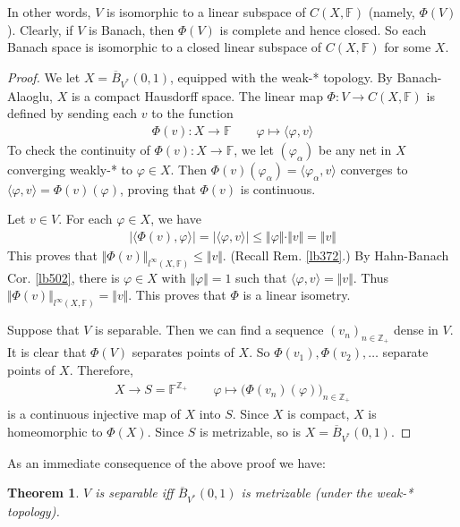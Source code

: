 \documentclass[12pt,b5paper,notitlepage]{article}
\theoremstyle{definition}
\theoremstyle{plain}
\newtheorem{thm}[df]{Theorem}
\newcommand{\ovl}{\overline}
\newcommand{\bk}[1]{\langle {#1}\rangle}
\newcommand{\Zbb}{\mathbb Z}
\newcommand{\Fbb}{\mathbb F}
\numberwithin{equation}{section}
\begin{document}
In other words, $V$ is isomorphic to a linear subspace of $C(X,\Fbb)$ (namely, $\Phi(V)$). Clearly, if $V$ is Banach, then $\Phi(V)$ is complete and hence closed. So each Banach space is isomorphic to a closed linear subspace of $C(X,\Fbb)$ for some $X$.

\begin{proof}
We let $X=\ovl B_{V^*}(0,1)$, equipped with the weak-* topology. By Banach-Alaoglu, $X$ is a compact Hausdorff space. The linear map $\Phi:V\rightarrow C(X,\Fbb)$ is defined by sending each $v$ to the function
\begin{align*}
\Phi(v):X\rightarrow \Fbb\qquad\varphi\mapsto \bk{\varphi,v}
\end{align*}
To check the continuity of $\Phi(v):X\rightarrow\Fbb$, we let $(\varphi_\alpha)$ be any net in $X$ converging weakly-* to $\varphi\in X$. Then $\Phi(v)(\varphi_\alpha)=\bk{\varphi_\alpha,v}$ converges to $\bk{\varphi,v}=\Phi(v)(\varphi)$, proving that $\Phi(v)$ is continuous.

Let $v\in V$. For each $\varphi\in X$, we have
\begin{align*}
|\bk{\Phi(v),\varphi}|=|\bk{\varphi,v}|\leq\Vert\varphi\Vert\cdot\Vert v\Vert=\Vert v\Vert
\end{align*}
This proves that $\Vert \Phi(v)\Vert_{l^\infty(X,\Fbb)}\leq \Vert v\Vert$. (Recall Rem. \ref{lb372}.) By Hahn-Banach Cor. \ref{lb502}, there is $\varphi\in X$ with $\Vert\varphi\Vert=1$ such that $\bk{\varphi,v}=\Vert v\Vert$. Thus $\Vert \Phi(v)\Vert_{l^\infty(X,\Fbb)}=\Vert v\Vert$. This proves that $\Phi$ is a linear isometry.

Suppose that $V$ is separable. Then we can find a sequence $(v_n)_{n\in\Zbb_+}$ dense in $V$.  It is clear that $\Phi(V)$ separates points of $X$. So $\Phi(v_1),\Phi(v_2),\dots$ separate points of $X$.
Therefore,
\begin{align}
X\rightarrow S=\Fbb^{\Zbb_+}\qquad \varphi\mapsto \big(\Phi(v_n)(\varphi)\big)_{n\in\Zbb_+}
\end{align} 
is a continuous injective map of $X$ into $S$. Since $X$ is compact, $X$ is homeomorphic to $\Phi(X)$. Since $S$ is metrizable, so is $X=\ovl B_{V^*}(0,1)$.
\end{proof}


As an immediate consequence of the above proof we have:

\begin{thm}\label{lb523}
$V$ is separable iff $\ovl B_{V^*}(0,1)$ is metrizable (under the weak-* topology).
\end{thm}
\end{document}
